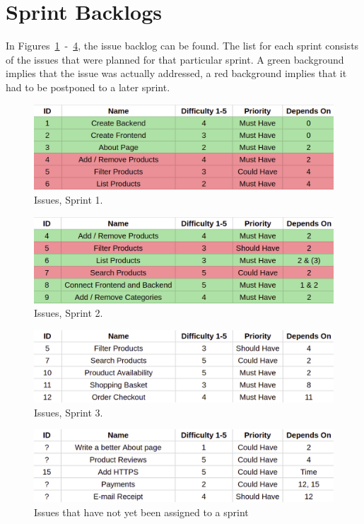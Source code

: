 \newpage

\section{Sprint Backlogs}

In Figures~\ref{fig:sprint_1}~-~\ref{fig:sprint_4}, the issue backlog can
be found. The list for each sprint consists of the issues that were planned
for that particular sprint. A green background implies that the issue was
actually addressed, a red background implies that it had to be postponed to
a later sprint.

\begin{figure}[H]
\centering
\includegraphics[width=\textwidth]{third_sprint/sprint_1.png}
\caption{\label{fig:sprint_1} Issues, Sprint 1.}
\end{figure}

\begin{figure}[H]
\centering
\includegraphics[width=\textwidth]{third_sprint/sprint_2.png}
\caption{\label{fig:sprint_2} Issues, Sprint 2.}
\end{figure}

\begin{figure}[H]
\centering
\includegraphics[width=\textwidth]{third_sprint/sprint_3.png}
\caption{\label{fig:sprint_3} Issues, Sprint 3.}
\end{figure}

\begin{figure}[H]
\centering
\includegraphics[width=\textwidth]{third_sprint/other.png}
\caption{\label{fig:sprint_4} Issues that have not yet been assigned to
a sprint}
\end{figure}
